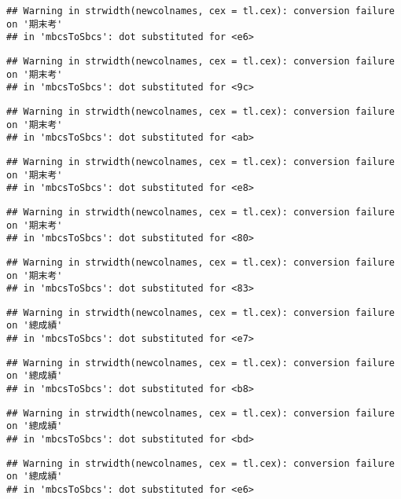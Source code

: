 \documentclass[
]{book}
\begin{document}
\begin{verbatim}
## Warning in strwidth(newcolnames, cex = tl.cex): conversion failure on '期末考'
## in 'mbcsToSbcs': dot substituted for <e6>
\end{verbatim}

\begin{verbatim}
## Warning in strwidth(newcolnames, cex = tl.cex): conversion failure on '期末考'
## in 'mbcsToSbcs': dot substituted for <9c>
\end{verbatim}

\begin{verbatim}
## Warning in strwidth(newcolnames, cex = tl.cex): conversion failure on '期末考'
## in 'mbcsToSbcs': dot substituted for <ab>
\end{verbatim}

\begin{verbatim}
## Warning in strwidth(newcolnames, cex = tl.cex): conversion failure on '期末考'
## in 'mbcsToSbcs': dot substituted for <e8>
\end{verbatim}

\begin{verbatim}
## Warning in strwidth(newcolnames, cex = tl.cex): conversion failure on '期末考'
## in 'mbcsToSbcs': dot substituted for <80>
\end{verbatim}

\begin{verbatim}
## Warning in strwidth(newcolnames, cex = tl.cex): conversion failure on '期末考'
## in 'mbcsToSbcs': dot substituted for <83>
\end{verbatim}

\begin{verbatim}
## Warning in strwidth(newcolnames, cex = tl.cex): conversion failure on '總成績'
## in 'mbcsToSbcs': dot substituted for <e7>
\end{verbatim}

\begin{verbatim}
## Warning in strwidth(newcolnames, cex = tl.cex): conversion failure on '總成績'
## in 'mbcsToSbcs': dot substituted for <b8>
\end{verbatim}

\begin{verbatim}
## Warning in strwidth(newcolnames, cex = tl.cex): conversion failure on '總成績'
## in 'mbcsToSbcs': dot substituted for <bd>
\end{verbatim}

\begin{verbatim}
## Warning in strwidth(newcolnames, cex = tl.cex): conversion failure on '總成績'
## in 'mbcsToSbcs': dot substituted for <e6>
\end{verbatim}
\end{document}
